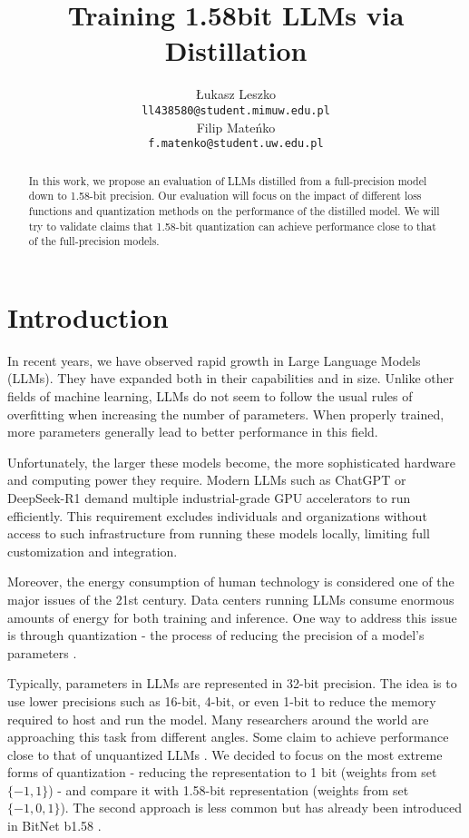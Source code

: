 \documentclass{article}
\title{Training 1.58bit LLMs via Distillation}
\author{Łukasz Leszko \\
	\texttt{ll438580@student.mimuw.edu.pl} \\
	\And
	Filip Mateńko \\
	\texttt{f.matenko@student.uw.edu.pl} \\
}
\begin{document}
\maketitle

\begin{abstract}
In this work, we propose an evaluation of LLMs distilled from a full-precision model down to 1.58-bit precision. Our evaluation will focus on the impact of different loss functions and quantization methods on the performance of the distilled model. We will try to validate claims that 1.58-bit quantization can achieve performance close to that of the full-precision models.
\end{abstract}




\section{Introduction}
In recent years, we have observed rapid growth in Large Language Models (LLMs). They have expanded both in their capabilities and in size. 
Unlike other fields of machine learning, LLMs do not seem to follow the usual rules of overfitting when increasing the number of 
parameters. When properly trained, more parameters generally lead to better performance in this field. 

Unfortunately, the larger these models become, the more sophisticated hardware and computing power they require. Modern LLMs such as 
ChatGPT or DeepSeek-R1 demand multiple industrial-grade GPU accelerators to run efficiently. This requirement excludes individuals and 
organizations without access to such infrastructure from running these models locally, limiting full customization and integration.

Moreover, the energy consumption of human technology is considered one of the major issues of the 21st century. Data centers running LLMs 
consume enormous amounts of energy for both training and inference. One way to address this issue is through quantization - the process of 
reducing the precision of a model's parameters \cite{quantizationtechniques}.

Typically, parameters in LLMs are represented in 32-bit precision. The idea is to use lower precisions such as 16-bit, 4-bit, 
or even 1-bit to reduce the memory required to host and run the model. Many researchers around the world are approaching this task from 
different angles. Some claim to achieve performance close to that of unquantized LLMs \cite{wang2023bitnetscaling1bittransformers}. We 
decided to focus on the most extreme forms of quantization - reducing the representation to 1 bit (weights from set \(\{-1,1\}\)) - and compare it
with 1.58-bit representation (weights from set \(\{-1,0,1\}\)). The second approach is less common but has already been introduced in BitNet 
b1.58 \cite{ma2024era1bitllmslarge}.
\end{document}
